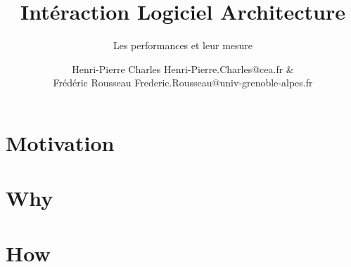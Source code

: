 \documentclass{beamer}
\title{Intéraction Logiciel Architecture}
\subtitle{Les performances et leur mesure}
\author{Henri-Pierre Charles Henri-Pierre.Charles@cea.fr \& \\
Frédéric Rousseau Frederic.Rousseau@univ-grenoble-alpes.fr}
\date{}
\newcommand{\Slide}[1]{}
\begin{document}
\begin{frame}
\titlepage
\end{frame}

\section{Motivation}
\Slide{Metrics/HowMany}
\Slide{Metrics/Moore}
\Slide{Metrics/Top500}

\begin{frame}
  \begin{multicols}{2}
    \tableofcontents[]
  \end{multicols}
\end{frame}
\section{Why}
\Slide{Metrics/HowToMeasure}
\Slide{Metrics/FLOPS}
\Slide{Metrics/Sustained}
\Slide{Metrics/Lois}
\Slide{Metrics/Speedup}
\Slide{Metrics/Amdahl2}
\Slide{Metrics/Amdahl}
\Slide{Metrics/Roofline}
\Slide{Metrics/Roofline2}

\section{How}
\Slide{Comment/Outillage}
\Slide{Comment/C2}
\Slide{Comment/gprof}
\Slide{Comment/PerfCounter}
\Slide{Comment/JTAG}
\Slide{Comment/FPGA}
\Slide{Comment/HwEmulator}
\Slide{Comment/gdb}
\Slide{Comment/qemu}
\Slide{Comment/CrossCompiler}
\Slide{Comment/Stats}
\end{document}
